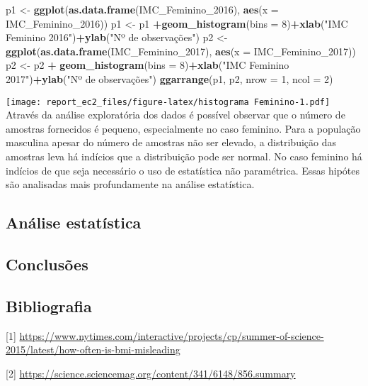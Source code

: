 \documentclass[]{article}
\newenvironment{Shaded}{\begin{snugshade}}{\end{snugshade}}
\newcommand{\DataTypeTok}[1]{\textcolor[rgb]{0.13,0.29,0.53}{#1}}
\newcommand{\DecValTok}[1]{\textcolor[rgb]{0.00,0.00,0.81}{#1}}
\newcommand{\KeywordTok}[1]{\textcolor[rgb]{0.13,0.29,0.53}{\textbf{#1}}}
\newcommand{\NormalTok}[1]{#1}
\newcommand{\OperatorTok}[1]{\textcolor[rgb]{0.81,0.36,0.00}{\textbf{#1}}}
\newcommand{\StringTok}[1]{\textcolor[rgb]{0.31,0.60,0.02}{#1}}
\begin{document}
\begin{Shaded}
\begin{Highlighting}[]
\NormalTok{p1 <-}\StringTok{ }\KeywordTok{ggplot}\NormalTok{(}\KeywordTok{as.data.frame}\NormalTok{(IMC_Feminino_}\DecValTok{2016}\NormalTok{), }\KeywordTok{aes}\NormalTok{(}\DataTypeTok{x =}\NormalTok{ IMC_Feminino_}\DecValTok{2016}\NormalTok{))}
\NormalTok{p1 <-}\StringTok{ }\NormalTok{p1 }\OperatorTok{+}\KeywordTok{geom_histogram}\NormalTok{(}\DataTypeTok{bins =} \DecValTok{8}\NormalTok{)}\OperatorTok{+}\KeywordTok{xlab}\NormalTok{(}\StringTok{"IMC Feminino 2016"}\NormalTok{)}\OperatorTok{+}\KeywordTok{ylab}\NormalTok{(}\StringTok{"Nº de observações"}\NormalTok{)}
\NormalTok{p2 <-}\StringTok{ }\KeywordTok{ggplot}\NormalTok{(}\KeywordTok{as.data.frame}\NormalTok{(IMC_Feminino_}\DecValTok{2017}\NormalTok{), }\KeywordTok{aes}\NormalTok{(}\DataTypeTok{x =}\NormalTok{ IMC_Feminino_}\DecValTok{2017}\NormalTok{))}
\NormalTok{p2 <-}\StringTok{ }\NormalTok{p2 }\OperatorTok{+}\StringTok{ }\KeywordTok{geom_histogram}\NormalTok{(}\DataTypeTok{bins =} \DecValTok{8}\NormalTok{)}\OperatorTok{+}\KeywordTok{xlab}\NormalTok{(}\StringTok{"IMC Feminino 2017"}\NormalTok{)}\OperatorTok{+}\KeywordTok{ylab}\NormalTok{(}\StringTok{"Nº de observações"}\NormalTok{)}
\KeywordTok{ggarrange}\NormalTok{(p1, p2, }\DataTypeTok{nrow =} \DecValTok{1}\NormalTok{, }\DataTypeTok{ncol =} \DecValTok{2}\NormalTok{)}
\end{Highlighting}
\end{Shaded}

\texttt{[image: report\_ec2\_files/figure-latex/histograma Feminino-1.pdf]}
Através da análise exploratória dos dados é possível observar que o
número de amostras fornecidos é pequeno, especialmente no caso feminino.
Para a população masculina apesar do número de amostras não ser elevado,
a distribuição das amostras leva há indícios que a distribuição pode ser
normal. No caso feminino há indícios de que seja necessário o uso de
estatística não paramétrica. Essas hipótes são analisadas mais
profundamente na análise estatística.

\hypertarget{analise-estatistica}{%
\subsection{Análise estatística}\label{analise-estatistica}}

\hypertarget{conclusoes}{%
\subsection{Conclusões}\label{conclusoes}}

\hypertarget{bibliografia}{%
\subsection{Bibliografia}\label{bibliografia}}

{[}1{]}
\url{https://www.nytimes.com/interactive/projects/cp/summer-of-science-2015/latest/how-often-is-bmi-misleading}

{[}2{]}
\url{https://science.sciencemag.org/content/341/6148/856.summary}
\end{document}
